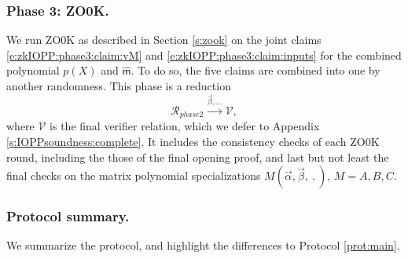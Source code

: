 \subsubsection{Phase 3: ZO0K.}
We run ZO0K as described in Section \ref{s:zook} on the joint claims \eqref{e:zkIOPP:phase3:claim:vM} and \eqref{e:zkIOPP:phase3:claim:inputs} for the combined polynomial $p(X)$ and $\hat{\mathsf m}$.
To do so, the five claims are combined into one by another randomness.
This phase is a reduction 
\[
\mathcal R_{phase 2} \stackrel{\vec\beta, \ldots}{\longrightarrow} \mathcal V,
\]
where $\mathcal V$ is the final verifier relation, which we defer to Appendix \ref{s:IOPPsoundness:complete}. 
It includes the consistency checks of each ZO0K round, including the those of the final opening proof, and last but not least the final checks on the matrix polynomial specializations $M(\vec\alpha, \vec\beta,\:.\:)$, $M=A,B,C$.


\subsubsection{Protocol summary.}
We summarize the protocol, and highlight the differences to Protocol \ref{prot:main}.

